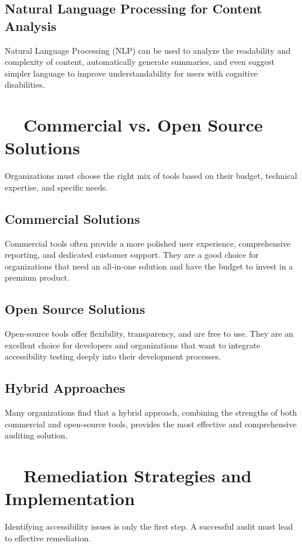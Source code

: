 \subsection{Natural Language Processing for Content Analysis}
\label{subsec:nlp-analysis}
Natural Language Processing (NLP) can be used to analyze the readability and complexity of content, automatically generate summaries, and even suggest simpler language to improve understandability for users with cognitive disabilities.
\supercite{Lundgard2022Accessible}

\section{~~Commercial vs. Open Source Solutions}
\label{sec:commercial-vs-open-source}
Organizations must choose the right mix of tools based on their budget, technical expertise, and specific needs.

\subsection{Commercial Solutions}
\label{subsec:commercial-solutions}
Commercial tools often provide a more polished user experience, comprehensive reporting, and dedicated customer support. They are a good choice for organizations that need an all-in-one solution and have the budget to invest in a premium product.

\subsection{Open Source Solutions}
\label{subsec:open-source-solutions}
Open-source tools offer flexibility, transparency, and are free to use. They are an excellent choice for developers and organizations that want to integrate accessibility testing deeply into their development processes.

\subsection{Hybrid Approaches}
\label{subsec:hybrid-approaches}
Many organizations find that a hybrid approach, combining the strengths of both commercial and open-source tools, provides the most effective and comprehensive auditing solution.

\section{~~Remediation Strategies and Implementation}
\label{sec:remediation-strategies}
Identifying accessibility issues is only the first step. A successful audit must lead to effective remediation.

